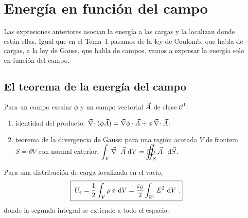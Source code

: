 \section{Energía en función del campo}\label{sec:campo}

Las expresiones anteriores asocian la energía a las cargas y la localizan donde están ellas. Igual que en el Tema~1 pasamos de la ley
de Coulomb, que habla de cargas, a la ley de Gauss, que habla de campos, vamos a expresar la energía solo en función del campo.

\subsection{El teorema de la energía del campo}

\begin{lema}\label{lem:herramientas}
Para un campo escalar $\phi$ y un campo vectorial $\vec A$ de clase $\mathcal C^1$:
\begin{enumerate}
  \item identidad del producto: $\vec\nabla\!\cdot(\phi\vec A)=\vec\nabla\phi\cdot\vec A+\phi\,\vec\nabla\!\cdot\vec A$;
  \item teorema de la divergencia de Gauss: para una región acotada $V$ de frontera $S=\partial V$ con normal exterior,
        $\displaystyle\int_V\vec\nabla\!\cdot\vec A\,\mathop{}\!\mathrm{d} V=\oiint_S\vec A\cdot\mathop{}\!\mathrm{d}\vec S$.
\end{enumerate}
\end{lema}

\begin{teorema}\label{teo:energia-campo}
Para una distribución de carga localizada en el vacío,
\begin{equation}\label{eq:energia-campo}
  \boxed{\;U_e=\frac12\int_V\rho\,\phi\,\mathop{}\!\mathrm{d} V=\frac{\varepsilon_0}{2}\int_{\mathbb R^3}E^2\,\mathop{}\!\mathrm{d} V\; ,}
\end{equation}
donde la segunda integral se extiende a todo el espacio.
\end{teorema}

